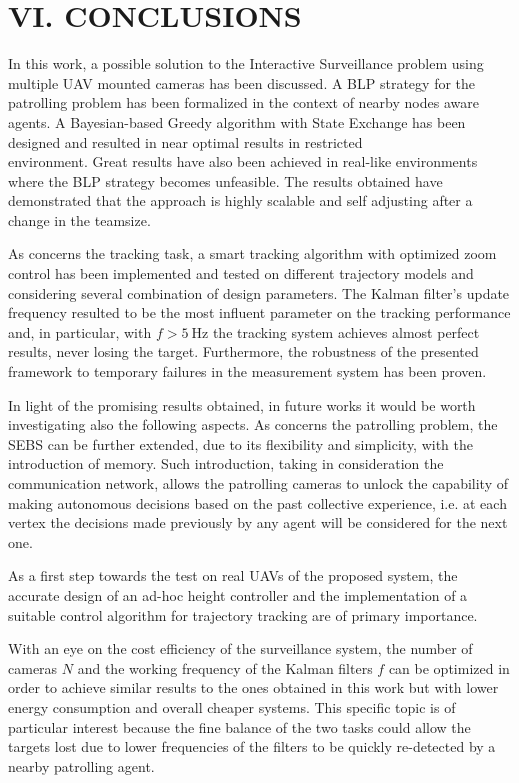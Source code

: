 \documentclass[conference]{IEEEtran}
\begin{document}
\section*{VI. CONCLUSIONS}
In this work, a possible solution to the Interactive Surveillance problem using multiple UAV mounted cameras has been discussed. A BLP strategy for the patrolling problem has been formalized in the context of nearby nodes aware agents. A Bayesian-based Greedy algorithm with State Exchange has been designed and resulted in near optimal results in restricted\\
environment. Great results have also been achieved in real-like environments where the BLP strategy becomes unfeasible. The results obtained have demonstrated that the approach is highly scalable and self adjusting after a change in the teamsize.

As concerns the tracking task, a smart tracking algorithm with optimized zoom control has been implemented and tested on different trajectory models and considering several combination of design parameters. The Kalman filter's update frequency resulted to be the most influent parameter on the tracking performance and, in particular, with $f>5 \mathrm{~Hz}$ the tracking system achieves almost perfect results, never losing the target. Furthermore, the robustness of the presented framework to temporary failures in the measurement system has been proven.

In light of the promising results obtained, in future works it would be worth investigating also the following aspects. As concerns the patrolling problem, the SEBS can be further extended, due to its flexibility and simplicity, with the introduction of memory. Such introduction, taking in consideration the communication network, allows the patrolling cameras to unlock the capability of making autonomous decisions based on the past collective experience, i.e. at each vertex the decisions made previously by any agent will be considered for the next one.

As a first step towards the test on real UAVs of the proposed system, the accurate design of an ad-hoc height controller and the implementation of a suitable control algorithm for trajectory tracking are of primary importance.

With an eye on the cost efficiency of the surveillance system, the number of cameras $N$ and the working frequency of the Kalman filters $f$ can be optimized in order to achieve similar results to the ones obtained in this work but with lower energy consumption and overall cheaper systems. This specific topic is of particular interest because the fine balance of the two tasks could allow the targets lost due to lower frequencies of the filters to be quickly re-detected by a nearby patrolling agent.
\end{document}
